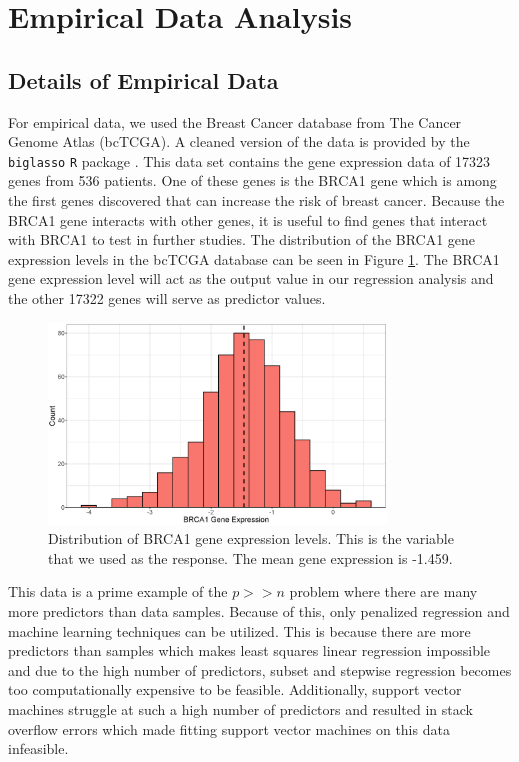 \documentclass{article}
\begin{document}
\section{Empirical Data Analysis}\label{sec:empirical}
\subsection{Details of Empirical Data}

For empirical data, we used the Breast Cancer database from The Cancer Genome Atlas (bcTCGA). A cleaned version of the data is provided by the \lstinline!biglasso! \lstinline!R! package \cite{zeng2017biglasso}. This data set contains the gene expression data of 17323 genes from 536 patients. One of these genes is the BRCA1 gene which is among the first genes discovered that can increase the risk of breast cancer. Because the BRCA1 gene interacts with other genes, it is useful to find genes that interact with BRCA1 to test in further studies. The distribution of the BRCA1 gene expression levels in the bcTCGA database can be seen in Figure \ref{fig:BRCA1-distribution}. The BRCA1 gene expression level will act as the output value in our regression analysis and the other 17322 genes will serve as predictor values.

\begin{figure}[h!]
	\centering
	\includegraphics[width = 0.8\textwidth]{images/empirical_histogram.eps}
	\captionsetup{width = 0.8\textwidth}
	\caption{Distribution of BRCA1 gene expression levels. This is the variable that we used as the response. The mean gene expression is -1.459.}
	\label{fig:BRCA1-distribution}
\end{figure}

This data is a prime example of the $p>>n$ problem where there are many more predictors than data samples. Because of this, only penalized regression and machine learning techniques can be utilized. This is because there are more predictors than samples which makes least squares linear regression impossible and due to the high number of predictors, subset and stepwise regression becomes too computationally expensive to be feasible. Additionally, support vector machines struggle at such a high number of predictors and resulted in stack overflow errors which made fitting support vector machines on this data infeasible.
\end{document}

